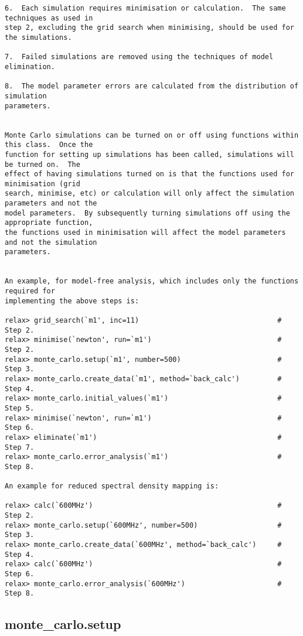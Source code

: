 {\begin{verbatim}
6.  Each simulation requires minimisation or calculation.  The same techniques as used in
step 2, excluding the grid search when minimising, should be used for the simulations.

7.  Failed simulations are removed using the techniques of model elimination.

8.  The model parameter errors are calculated from the distribution of simulation
parameters.


Monte Carlo simulations can be turned on or off using functions within this class.  Once the
function for setting up simulations has been called, simulations will be turned on.  The
effect of having simulations turned on is that the functions used for minimisation (grid
search, minimise, etc) or calculation will only affect the simulation parameters and not the
model parameters.  By subsequently turning simulations off using the appropriate function,
the functions used in minimisation will affect the model parameters and not the simulation
parameters.


An example, for model-free analysis, which includes only the functions required for
implementing the above steps is:

relax> grid_search(`m1', inc=11)                                 # Step 2.
relax> minimise(`newton', run=`m1')                              # Step 2.
relax> monte_carlo.setup(`m1', number=500)                       # Step 3.
relax> monte_carlo.create_data(`m1', method=`back_calc')         # Step 4.
relax> monte_carlo.initial_values(`m1')                          # Step 5.
relax> minimise(`newton', run=`m1')                              # Step 6.
relax> eliminate(`m1')                                           # Step 7.
relax> monte_carlo.error_analysis(`m1')                          # Step 8.

An example for reduced spectral density mapping is:

relax> calc(`600MHz')                                            # Step 2.
relax> monte_carlo.setup(`600MHz', number=500)                   # Step 3.
relax> monte_carlo.create_data(`600MHz', method=`back_calc')     # Step 4.
relax> calc(`600MHz')                                            # Step 6.
relax> monte_carlo.error_analysis(`600MHz')                      # Step 8.
\end{verbatim}
}



\newpage

\subsection{monte\_carlo.setup}


